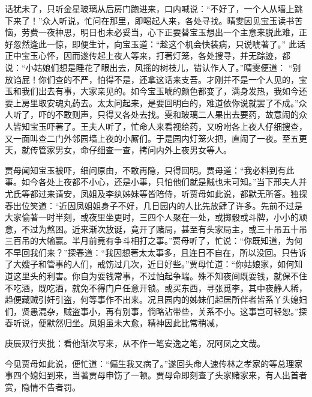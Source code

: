 \begin{parag}


    话犹未了，只听金星玻璃从后房门跑进来，口内喊说：“不好了，一个人从墙上跳下来了！”众人听说，忙问在那里，即喝起人来，各处寻找。晴雯因见宝玉读书苦恼，劳费一夜神思，明日也未必妥当，心下正要替宝玉想出一个主意来脱此难，正好忽然逢此一惊，即便生计，向宝玉道：“趁这个机会快装病，只说唬著了。” 此话正中宝玉心怀，因而遂传起上夜人等来，打著灯笼，各处搜寻，并无踪迹，都说：“小姑娘们想是睡花了眼出去，风摇的树枝儿，错认作人了。”晴雯便道： “别放诌屁！你们查的不严，怕得不是，还拿这话来支吾。才刚并不是一个人见的，宝玉和我们出去有事，大家亲见的。如今宝玉唬的颜色都变了，满身发热，我如今还要上房里取安魂丸药去。太太问起来，是要回明白的，难道依你说就罢了不成。”众人听了，吓的不敢则声，只得又各处去找。雯和玻璃二人果出去要药，故意闹的众人皆知宝玉吓著了。王夫人听了，忙命人来看视给药，又吩咐各上夜人仔细搜查，又一面叫查二门外邻园墙上夜的小厮们。于是园内灯笼火把，直闹了一夜。至五更天，就传管家男女，命仔细查一查，拷问内外上夜男女等人。
\end{parag}


\begin{parag}


    贾母闻知宝玉被吓，细问原由，不敢再隐，只得回明。贾母道：“我必料到有此事。如今各处上夜都不小心，还是小事，只怕他们就是贼也未可知。”当下邢夫人并尤氏等都过来请安，凤姐及李纨姊妹等皆陪侍，听贾母如此说，都默无所答。独探春出位笑道：“近因凤姐姐身子不好，几日园内的人比先放肆了许多。先前不过是大家偷著一时半刻，或夜里坐更时，三四个人聚在一处，或掷骰或斗牌，小小的顽意，不过为熬困。近来渐次放诞，竟开了赌局，甚至有头家局主，或三十吊五十吊三百吊的大输赢。半月前竟有争斗相打之事。”贾母听了，忙说：“你既知道，为何不早回我们来？”探春道：“我因想著太太事多，且连日不自在，所以没回。只告诉了大嫂子和管事的人们，戒饬过几次，近日好些。”贾母忙道：“你姑娘家，如何知道这里头的利害。你自为耍钱常事，不过怕起争端。殊不知夜间既耍钱，就保不住不吃酒，既吃酒，就免不得门户任意开锁。或买东西，寻张觅李，其中夜静人稀，趋便藏贼引奸引盗，何等事作不出来。况且园内的姊妹们起居所伴者皆系丫头媳妇们，贤愚混杂，贼盗事小，再有别事，倘略沾带些，关系不小。这事岂可轻恕。”探春听说，便默然归坐。凤姐虽未大愈，精神因此比常稍减，\begin{note}庚辰双行夹批：看他渐次写来，从不作一笔安逸之笔，况阿凤之文哉。\end{note}今见贾母如此说，便忙道：“偏生我又病了。”遂回头命人速传林之孝家的等总理家事四个媳妇到来，当著贾母申饬了一顿。贾母命即刻查了头家赌家来，有人出首者赏，隐情不告者罚。
\end{parag}



